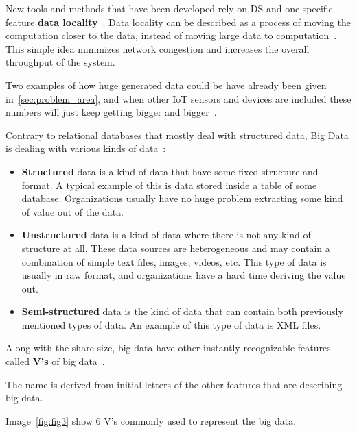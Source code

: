 New tools and methods that have been developed rely on DS and one specific feature \textbf{data locality}~\label{ds:data_locality}. Data locality can be described as a process of moving the computation closer to the data, instead of moving large data to computation~\cite{GuoFZ12}. This simple idea minimizes network congestion and increases the overall throughput of the system.

Two examples of how huge generated data could be have already been given in~\ref{sec:problem_area}, and when other IoT sensors and devices are included these numbers will just keep getting bigger and bigger~\cite{SarigiannidisLR20}.

Contrary to relational databases that mostly deal with structured data, Big Data is dealing with various kinds of data~\cite{FisherDCD12, Tsai2015, GuoFZ12}:

\begin{itemize}
	\item \textbf{Structured} data is a kind of data that have some fixed structure and format. A typical example of this is data stored inside a table of some database. Organizations usually have no huge problem extracting some kind of value out of the data.
	\item \textbf{Unstructured} data is a kind of data where there is not any kind of structure at all. These data sources are heterogeneous and may contain a combination of simple text files, images, videos, etc. This type of data is usually in raw format, and organizations have a hard time deriving the value out.
	\item \textbf{Semi-structured} data is the kind of data that can contain both previously mentioned types of data. An example of this type of data is XML files.
\end{itemize}

\noindent
Along with the share size, big data have other instantly recognizable features called \textbf{V's} of big data~\cite{PatgiriA16}. 

The name is derived from initial letters of the other features that are describing big data. 

Image~\ref{fig:fig3} show 6 V's commonly used to represent the big data.

